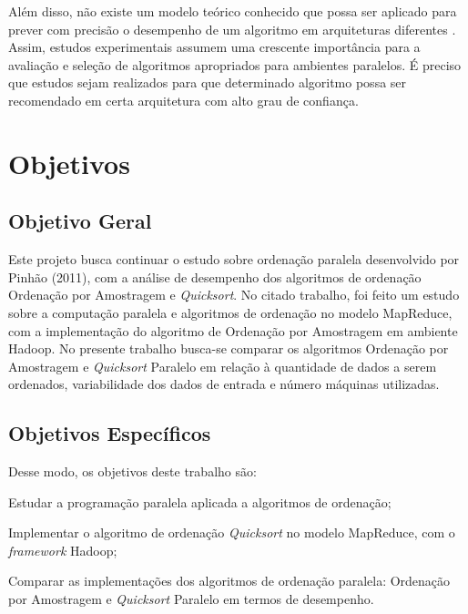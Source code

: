  Além disso, não existe um modelo teórico conhecido que possa ser aplicado para prever com precisão o desempenho de um algoritmo em arquiteturas diferentes \cite{Amato:1996}.
Assim, estudos experimentais assumem uma crescente importância para a avaliação e seleção de algoritmos apropriados para ambientes paralelos. É preciso que estudos sejam realizados para que determinado algoritmo possa ser recomendado em certa arquitetura com alto grau de confiança.




\section{Objetivos}
\label{sec:objetivos}

\subsection{Objetivo Geral}
\label{subsec:objetivoGeral}

Este projeto busca continuar o estudo sobre ordenação paralela desenvolvido por Pinhão (2011), com a análise de desempenho dos algoritmos de ordenação Ordenação por Amostragem e \textit{Quicksort}. No citado trabalho, foi feito um estudo sobre a computação paralela e algoritmos de ordenação no modelo MapReduce, com a implementação do algoritmo de Ordenação por Amostragem em ambiente Hadoop. 
No presente trabalho busca-se comparar os algoritmos Ordenação por Amostragem e \textit{Quicksort} Paralelo em relação à quantidade de dados a serem ordenados, variabilidade dos dados de entrada e número máquinas utilizadas. 


\subsection{Objetivos Específicos}
\label{subsec:objetivosEspecificos}

Desse modo, os objetivos deste trabalho são:

\begin{packed_enum}
\item Estudar a programação paralela aplicada a algoritmos de ordenação;
\item Implementar o algoritmo de ordenação  \textit{Quicksort} no modelo MapReduce, com o \textit{framework} Hadoop;
\item Comparar as implementações dos algoritmos de ordenação paralela: Ordenação por Amostragem e \textit{Quicksort} Paralelo em termos de desempenho.
\end{packed_enum}

